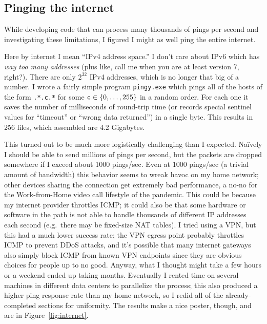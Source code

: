 \documentclass[twocolumn]{article}
\begin{document}
\subsection{Pinging the internet} \label{sec:ping-internet}

While developing code that can process many thousands of pings per second
and investigating these limitations, I figured I might as well ping the
entire internet.

Here by internet I mean ``IPv4 address space.'' I don't care about
IPv6 which has {\it way too many addresses} (plus like, call me when
you are at least version 7, right?). There are only $2^{32}$ IPv4
addresses, which is no longer that big of a number. I wrote a fairly
simple program {\tt pingy.exe} which pings all of the hosts of the
form {\tt *.*.c.*} for some ${\tt c} \in \{0,\ldots,255\}$ in a random
order. For each one it saves the number of milliseconds of round-trip
time (or records special sentinel values for ``timeout'' or ``wrong
data returned'') in a single byte. This results in 256 files, which
assembled are 4.2 Gigabytes.

This turned out to be much more logistically challenging than I
expected. Na\"ively I should be able to send millions of pings per
second, but the packets are dropped somewhere if I exceed about 1000
pings/sec. Even at 1000 pings/sec (a trivial amount of bandwidth) this
behavior seems to wreak havoc on my home network; other devices
sharing the connection get extremely bad performance, a no-no for the
Work-from-Home video call lifestyle of the pandemic. This could be because
my internet provider throttles ICMP; it could also be that some
hardware or software in the path is not able to handle thousands of
different IP addresses each second (e.g.~there may be fixed-size NAT
tables). I tried using a VPN, but this had a much lower success rate;
the VPN egress point probably throttles ICMP to prevent DDoS attacks,
and it's possible that many internet gateways also simply block ICMP
from known VPN endpoints since they are obvious choices for people up
to no good. Anyway, what I thought might take a few hours or a weekend
ended up taking months. Eventually I rented time on several machines
in different data centers to parallelize the process; this also
produced a higher ping response rate than my home network, so I redid
all of the already-completed sections for uniformity. The results make
a nice poster, though, and are in Figure~\ref{fig:internet}.
\end{document}
